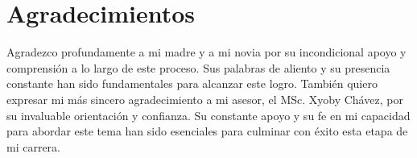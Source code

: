 \chapter*{\centering \large Agradecimientos} %

\justify
Agradezco profundamente a mi madre y a mi novia por su incondicional apoyo y comprensión a lo largo de este proceso. Sus palabras de aliento y su presencia constante han sido fundamentales para alcanzar este logro. También quiero expresar mi más sincero agradecimiento a mi asesor, el MSc. Xyoby Chávez, por su invaluable orientación y confianza. Su constante apoyo y su fe en mi capacidad para abordar este tema han sido esenciales para culminar con éxito esta etapa de mi carrera.
